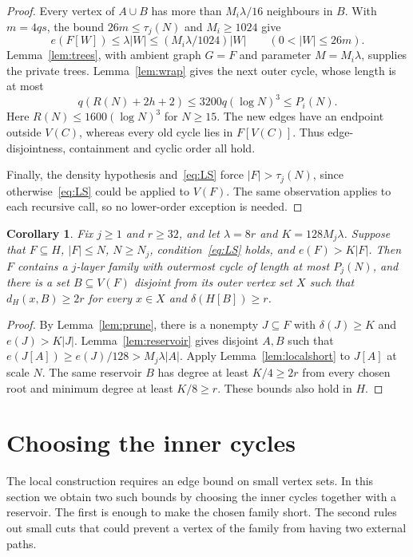 \documentclass[10pt,letterpaper]{article}
\newtheorem{corollary}[theorem]{Corollary}
\theoremstyle{definition}
\theoremstyle{remark}
\begin{document}
\begin{proof}
Every vertex of $A\cup B$ has more than $M_i\lambda/16$ neighbours in $B$. With $m=4qs$, the bound $26m\le\tau_j(N)$ and $M_i\ge1024$ give
\[
e(F[W])\le\lambda|W|\le(M_i\lambda/1024)|W|
\qquad(0<|W|\le26m).
\]
Lemma~\ref{lem:trees}, with ambient graph $G=F$ and parameter $M=M_i\lambda$, supplies the private trees. Lemma~\ref{lem:wrap} gives the next outer cycle, whose length is at most
\[
q(R(N)+2h+2)\le3200q(\log N)^3\le P_i(N).
\]
Here $R(N)\le1600(\log N)^3$ for $N\ge15$. The new edges have an endpoint outside $V(C)$, whereas every old cycle lies in $F[V(C)]$. Thus edge-disjointness, containment and cyclic order all hold.

Finally, the density hypothesis and~\eqref{eq:LS} force $|F|>\tau_j(N)$, since otherwise~\eqref{eq:LS} could be applied to $V(F)$. The same observation applies to each recursive call, so no lower-order exception is needed.
\end{proof}

\begin{corollary}\label{cor:reservedlocal}
Fix $j\ge1$ and $r\ge32$, and let $\lambda=8r$ and $K=128M_j\lambda$. Suppose that $F\subseteq H$, $|F|\le N$, $N\ge N_j$, condition~\eqref{eq:LS} holds, and $e(F)>K|F|$. Then $F$ contains a $j$-layer family with outermost cycle of length at most $P_j(N)$, and there is a set $B\subseteq V(F)$ disjoint from its outer vertex set $X$ such that $d_H(x,B)\ge2r$ for every $x\in X$ and $\delta(H[B])\ge r$.
\end{corollary}
\begin{proof}
By Lemma~\ref{lem:prune}, there is a nonempty $J\subseteq F$ with $\delta(J)\ge K$ and $e(J)>K|J|$. Lemma~\ref{lem:reservoir} gives disjoint $A,B$ such that $e(J[A])\ge e(J)/128>M_j\lambda|A|$. Apply Lemma~\ref{lem:localshort} to $J[A]$ at scale $N$. The same reservoir $B$ has degree at least $K/4\ge2r$ from every chosen root and minimum degree at least $K/8\ge r$. These bounds also hold in $H$.
\end{proof}

\section{Choosing the inner cycles}\label{sec:selection}

The local construction requires an edge bound on small vertex sets. In this section we obtain two such bounds by choosing the inner cycles together with a reservoir. The first is enough to make the chosen family short. The second rules out small cuts that could prevent a vertex of the family from having two external paths.
\end{document}
